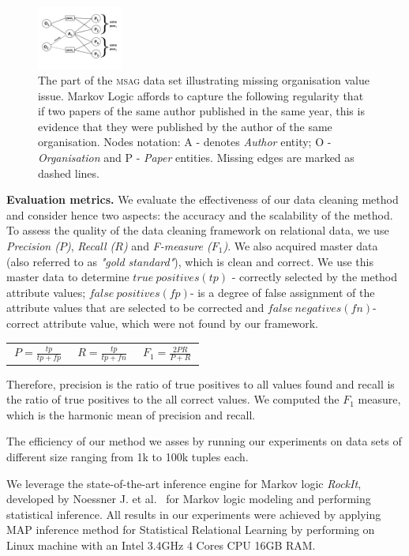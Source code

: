 \begin{figure}[t]
    \centering
    \includegraphics[width=0.25\textwidth, trim = 0mm 4mm 0mm 5mm, clip]{img/graph01.png}
    \caption{The part of the \textsc{msag} data set illustrating missing organisation value issue. Markov Logic affords to capture the following regularity that if two papers of the same author published in the same year, this is evidence that they were published by the author of the same organisation. Nodes notation: A - denotes \textit{Author} entity; O - \textit{Organisation} and P - \textit{Paper} entities. Missing edges are marked as dashed lines.}
    \label{fig:msagmissing}
\end{figure}

\textbf{Evaluation metrics.} We evaluate the effectiveness of our data cleaning method and consider hence two aspects: the accuracy and the scalability of the method. To assess the quality of the data cleaning framework on relational data, we use \textit{Precision ($P$)}, \textit{Recall ($R$)} and \textit{F-measure ($F_1$)}. We also acquired master data (also referred to as \textit{"gold standard"}), which is clean and correct. We use this master data to determine $true~positives (tp)$ - correctly selected by the method attribute values; $false~positives (fp)$- is a degree of false assignment of the attribute values that are selected to be corrected and $false~negatives (fn)$- correct attribute value, which were not found by our framework.

\begin{tabular}{ l l l }
$~P=\frac{tp}{tp+fp}~$ & $~R=\frac{tp}{tp+fn}~$ & $~F_1=\frac{2PR}{P+R}~$ \\
\end{tabular}

Therefore, precision is the ratio of true positives to all values found and recall is the ratio of true positives to the all correct values. We computed the $F_1$ measure, which is the harmonic mean of precision and recall.

The efficiency of our method we asses by running our experiments on data sets of different size ranging from 1k to 100k tuples each.

We leverage the state-of-the-art inference engine for Markov logic \textit{RockIt}, developed by Noessner J. et al.~\cite{NoessnerNS13} for Markov logic modeling and performing statistical inference. All results in our experiments were achieved by applying MAP inference method for Statistical Relational Learning by performing on Linux machine with an Intel 3.4GHz 4 Cores CPU 16GB RAM.


